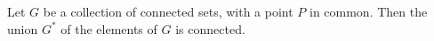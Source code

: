 Let $G$ be a collection of connected sets, with a point $P$ in common. Then the union $G^{*}$ of the elements of $G$ is connected.
